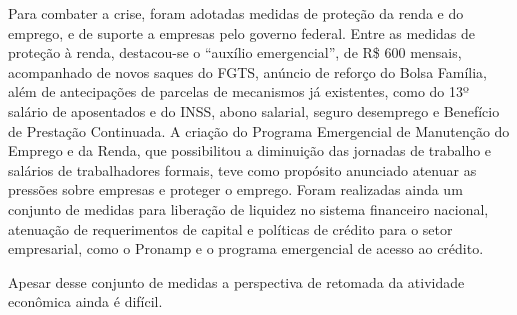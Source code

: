 \documentclass[11pt]{article}
\begin{document}
Para combater a crise, foram adotadas medidas de proteção da renda e do emprego, e de suporte a empresas pelo governo federal.  Entre as medidas de proteção à renda, destacou-se o “auxílio emergencial”, de R\$ 600 mensais, acompanhado de novos saques do FGTS, anúncio de reforço do Bolsa Família, além de antecipações de parcelas de mecanismos já existentes, como do 13º salário de aposentados e do INSS,  abono salarial, seguro desemprego e Benefício de Prestação Continuada. A criação do Programa Emergencial de Manutenção do Emprego e da Renda, que possibilitou a diminuição das jornadas de trabalho e salários de trabalhadores formais, teve como propósito anunciado atenuar as pressões sobre empresas e proteger o emprego. Foram realizadas ainda um conjunto de medidas para liberação de liquidez no sistema financeiro nacional, atenuação de requerimentos de capital e políticas de crédito para o setor empresarial, como o Pronamp e o programa emergencial de acesso ao crédito.

Apesar desse conjunto de medidas a perspectiva de retomada da atividade econômica ainda é difícil.
\end{document}
